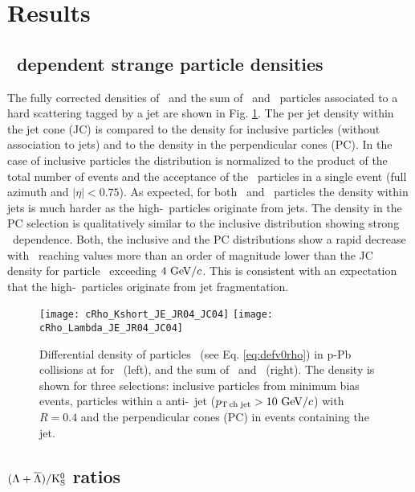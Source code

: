 
\section{Results}
\label{sec:Results}

\subsection{\pt\ dependent strange particle densities}

The fully corrected densities of \ks\ and the sum of \lda\ and \alda\ particles associated to a hard scattering tagged by a jet are shown in Fig. \ref{fig:rhov0}. 
The per jet density within the jet cone (JC) is compared to the density for inclusive particles (without association to jets) and to the density in the perpendicular cones (PC).
In the case of inclusive particles the distribution is normalized to the product of the total number of events and the acceptance of the \vzero\ particles in a single event (full azimuth and $|\eta|<0.75$). 
As expected, for both \ks\ and \lda\ particles the density within jets is much harder as the high-\pt\ particles originate from jets. 
The density in the PC selection is qualitatively similar to the inclusive distribution showing strong \pt\ dependence. 
Both, the inclusive and the PC distributions show a rapid decrease with \pt\ reaching values more than an order of magnitude lower than the JC density for particle \pt\ exceeding $4~\mathrm{GeV}/c$.
This is consistent with an expectation that the high-\pt\ particles originate from jet fragmentation.

\begin{figure}[htbp]
	\centering
	\texttt{[image: cRho\_Kshort\_JE\_JR04\_JC04]}
	\texttt{[image: cRho\_Lambda\_JE\_JR04\_JC04]}
	\caption{Differential density of particles \drhodpt\ (see Eq. \ref{eq:defv0rho}) in p-Pb collisions at  for \ks\ (left), and the sum of \lda\ and \alda\ (right). The density is shown for three selections: inclusive particles from minimum bias events, particles within a anti-\kt\ jet ($p_\mathrm{T\,ch\;jet}>10~\mathrm{GeV}/c$) with $R=0.4$ and the perpendicular cones (PC) in events containing the jet.}
	\label{fig:rhov0}
\end{figure}

\subsection{$(\Lambda+\overline{\Lambda})/\rm{K}^{0}_{\rm S}$ ratios}

